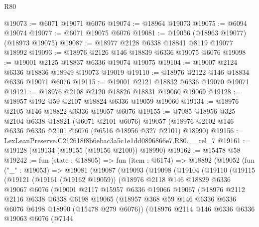 \begin{lexlean}{R80}
\begin{coremodule}
@19073 := @6071 @19071 @6076
@19074 := @18964 @19073
@19075 := @6094 @19074
@19077 := @6071 @19075 @6076
@19081 := @19056 (@18963 @19077) (@18973 @19075)
@19087 := @18977 @2128 @6338 @18841 @8119 @19077 @18992
@19093 := @18976 @2126 @146 @18839 @6336 @19075 @6076
@19098 := @19001 @2125 @18837 @6336 @19074 @19075
@19104 := @19007 @2124 @6336 @18836 @18949 @19073 @19019
@19110 := @18976 @2122 @146 @18834 @6336 @19071 @6076
@19115 := @19001 @2121 @18832 @6336 @19070 @19071
@19121 := @18976 @2108 @2120 @18826 @18831 @19060 @19069
@19128 := @18957 @192 @59 @2107 @18824 @6336 @19059 @19060
@19134 := @18976 @2105 @146 @18822 @6336 @19057 @6076
@19155 := @7085
    @18956
    @325
    @2104
    @6338
    @18821
    (@6071 @2101 @6076)
    @19057
    (@18976 @2102 @146 @6336 @6336 @2101 @6076 (@6516 @18956 @327 @2101) @18990)
@19156 := LexLeanPreserve.C212618f8b6ebac3a5c1e1dd0896866e7.R80.__rel_7
@19161 := @19128 (@19134 (@19155 (@19156 @2100)) @18990)
@19162 := @15478 @58
@19242 := fun (state : @18805) =>
  fun (item : @6174) =>
  @18892
    (@19052
      (fun ("_" : @19053) =>
      @19081
        (@19087
          (@19093
            (@19098
              (@19104
                (@19110
                  (@19115
                    (@19121
                      (@19161 (@19162 @19059))
                      (@18976
                        @2118
                        @146
                        @18829
                        @6336
                        @19067
                        @6076
                        (@19001
                          @2117
                          @15957
                          @6336
                          @19066
                          @19067
                          (@18976
                            @2112
                            @2116
                            @6338
                            @6338
                            @6198
                            @19065
                            (@18957
                              @368
                              @59
                              @146
                              @6336
                              @6336
                              @6076
                              @6198
                              @18990
                              (@15478 @279 @6076))
                            (@18976
                              @2114
                              @146
                              @6336
                              @6336
                              @19063
                              @6076
                              (@7144

\end{coremodule}
\end{lexlean}
